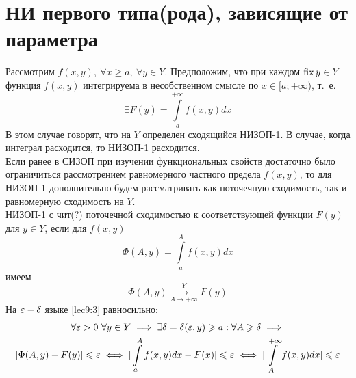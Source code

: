 \documentclass[../../main.tex]{subfiles}
\begin{document}
\section{НИ первого типа(рода), зависящие от параметра}

Рассмотрим $ f(x, y),\ \forall x \geq a,\ \forall y \in Y $.
Предположим, что при каждом $ \operatorname{fix} y \in Y $ функция $ f(x, y) $
интегрируема в несобственном смысле по $ x \in [a; +\infty) $, т.~е.
\begin{equation}
\label{lec9:1}
\exists F(y) = \int\limits_a^{+\infty} f(x, y) dx
\end{equation}
В этом случае говорят, что на $ Y $ определен сходящийся НИЗОП-1.
В случае, когда интеграл расходится, то НИЗОП-1 расходится.\\
Если ранее в СИЗОП при изучении функциональных свойств достаточно
было ограничиться рассмотрением равномерного частного предела $ f(x, y) $,
то для НИЗОП-1 дополнительно будем рассматривать как поточечную сходимость,
так и равномерную сходимость на $ Y $.\\
НИЗОП-1 с чит(?) поточечной сходимостью к соответствующей функции $ F(y) $
для $ y \in Y $, если для $ f(x, y) $ 
\begin{equation}
\label{lec9:2}
\Phi(A, y) = \int\limits_a^A f(x, y) dx
\end{equation}
имеем
\begin{equation}
\label{lec9:3}
\Phi(A, y) \stackrel{Y}{\underset{A \to +\infty}{\to}} F(y)
\end{equation}
На $ \varepsilon-\delta $ языке \eqref{lec9:3} равносильно:
\begin{equation}
\label{lec9:4}
\begin{gathered}
\forall \varepsilon > 0\ \forall y \in Y \implies \exists \delta = \delta(\varepsilon, y)
\geqslant a:\forall A \geqslant \delta \implies\\ 
|\Phi(A, y) - F(y)| \leqslant \varepsilon \iff
|\int\limits_a^A f(x, y) dx - F(x)| \leqslant \varepsilon \iff
|\int\limits_A^{+\infty} f(x, y) dx| \leqslant \varepsilon
\end{gathered}
\end{equation}
\end{document}
